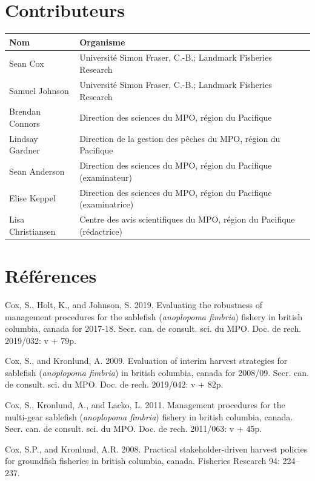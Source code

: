 \documentclass[11pt]{book}
\begin{document}
\hypertarget{contributeurs}{%
\section{Contributeurs}\label{contributeurs}}
\begin{longtable}[]{@{}ll@{}}
\toprule
Nom & Organisme\tabularnewline
\midrule
\endhead
Sean Cox & Université Simon Fraser, C.-B.; Landmark Fisheries Research\tabularnewline
Samuel Johnson & Université Simon Fraser, C.-B.; Landmark Fisheries Research\tabularnewline
Brendan Connors & Direction des sciences du MPO, région du Pacifique\tabularnewline
Lindsay Gardner & Direction de la gestion des pêches du MPO, région du Pacifique\tabularnewline
Sean Anderson & Direction des sciences du MPO, région du Pacifique (examinateur)\tabularnewline
Elise Keppel & Direction des sciences du MPO, région du Pacifique (examinatrice)\tabularnewline
Lisa Christiansen & Centre des avis scientifiques du MPO, région du Pacifique (rédactrice)\tabularnewline
\bottomrule
\end{longtable}
\hypertarget{ruxe9fuxe9rences}{%
\section{Références}\label{ruxe9fuxe9rences}}

\hypertarget{refs}{}
\leavevmode\hypertarget{ref-cox2019evaluating}{}%
Cox, S., Holt, K., and Johnson, S. 2019. Evaluating the robustness of management procedures for the sablefish (\emph{anoplopoma fimbria}) fishery in british columbia, canada for 2017-18. Secr. can. de consult. sci. du MPO. Doc. de rech. 2019/032: v + 79p.

\leavevmode\hypertarget{ref-cox2009evaluation}{}%
Cox, S., and Kronlund, A. 2009. Evaluation of interim harvest strategies for sablefish (\emph{anoplopoma fimbria}) in british columbia, canada for 2008/09. Secr. can. de consult. sci. du MPO. Doc. de rech. 2019/042: v + 82p.

\leavevmode\hypertarget{ref-cox2011management}{}%
Cox, S., Kronlund, A., and Lacko, L. 2011. Management procedures for the multi-gear sablefish (\emph{anoplopoma fimbria}) fishery in british columbia, canada. Secr. can. de consult. sci. du MPO. Doc. de rech. 2011/063: v + 45p.

\leavevmode\hypertarget{ref-cox2008practical}{}%
Cox, S.P., and Kronlund, A.R. 2008. Practical stakeholder-driven harvest policies for groundfish fisheries in british columbia, canada. Fisheries Research 94: 224--237.
\end{document}
